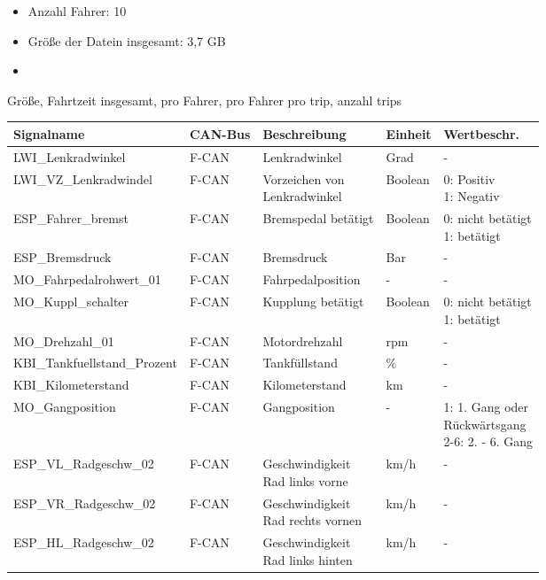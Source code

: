 \begin{itemize}
  \item Anzahl Fahrer: 10
  \item Größe der Datein insgesamt: 3,7 GB
  \item 
\end{itemize}
Größe, Fahrtzeit insgesamt, pro Fahrer, pro Fahrer pro trip, anzahl trips

\begin{table}[htbp]
	\centering
		\begin{tabular}{|l|l|l|l|l|}
		\hline
		\rowcolor[gray]{0.9}
		Signalname & CAN-Bus & Beschreibung & Einheit & Wertbeschr. \\
		\hline
    LWI\_Lenkradwinkel & F-CAN & Lenkradwinkel & Grad & - \\
    LWI\_VZ\_Lenkradwindel & F-CAN & \shortstack{Vorzeichen von \\ Lenkradwinkel} & Boolean & \shortstack{0: Positiv \\ 1: Negativ} \\
    ESP\_Fahrer\_bremst & F-CAN & Bremspedal betätigt & Boolean & \shortstack{0: nicht betätigt \\ 1: betätigt} \\
    ESP\_Bremsdruck & F-CAN & Bremsdruck & Bar & - \\
    MO\_Fahrpedalrohwert\_01 & F-CAN & Fahrpedalposition & - & - \\
    MO\_Kuppl\_schalter & F-CAN & Kupplung betätigt & Boolean & \shortstack{0: nicht betätigt \\ 1: betätigt} \\
    MO\_Drehzahl\_01 & F-CAN & Motordrehzahl & rpm & - \\
    KBI\_Tankfuellstand\_Prozent & F-CAN & Tankfüllstand & \% & - \\
    KBI\_Kilometerstand & F-CAN & Kilometerstand & km & - \\
    MO\_Gangposition & F-CAN & Gangposition & - & \shortstack{1: 1. Gang oder \\ Rückwärtsgang \\ 2-6: 2. - 6. Gang} \\
    ESP\_VL\_Radgeschw\_02 & F-CAN & \shortstack{Geschwindigkeit \\ Rad links vorne} & km/h & - \\
    ESP\_VR\_Radgeschw\_02 & F-CAN & \shortstack{Geschwindigkeit \\ Rad rechts vornen} & km/h & - \\
    ESP\_HL\_Radgeschw\_02 & F-CAN & \shortstack{Geschwindigkeit \\ Rad links hinten} & km/h & - \\

\end{tabular}
\end{table}

